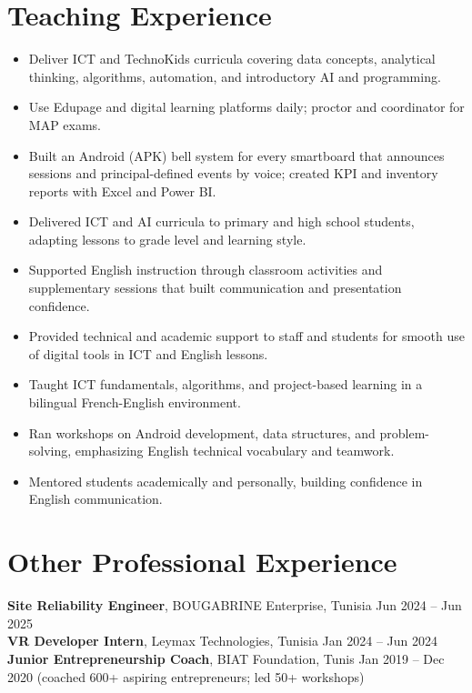 \documentclass[a4paper,10pt]{article}
\begin{document}
\section*{Teaching Experience}
\begin{itemize}
  \item Deliver ICT and TechnoKids curricula covering data concepts, analytical thinking, algorithms, automation, and introductory AI and programming.
  \item Use Edupage and digital learning platforms daily; proctor and coordinator for MAP exams.
  \item Built an Android (APK) bell system for every smartboard that announces sessions and principal-defined events by voice; created KPI and inventory reports with Excel and Power BI.
\end{itemize}
\begin{itemize}
  \item Delivered ICT and AI curricula to primary and high school students, adapting lessons to grade level and learning style.
  \item Supported English instruction through classroom activities and supplementary sessions that built communication and presentation confidence.
  \item Provided technical and academic support to staff and students for smooth use of digital tools in ICT and English lessons.
\end{itemize}
\begin{itemize}
  \item Taught ICT fundamentals, algorithms, and project-based learning in a bilingual French-English environment.
  \item Ran workshops on Android development, data structures, and problem-solving, emphasizing English technical vocabulary and teamwork.
  \item Mentored students academically and personally, building confidence in English communication.
\end{itemize}

\section*{Other Professional Experience}
\textbf{Site Reliability Engineer}, BOUGABRINE Enterprise, Tunisia \hfill Jun 2024 -- Jun 2025\\
\textbf{VR Developer Intern}, Leymax Technologies, Tunisia \hfill Jan 2024 -- Jun 2024\\
\textbf{Junior Entrepreneurship Coach}, BIAT Foundation, Tunis \hfill Jan 2019 -- Dec 2020 (coached 600+ aspiring entrepreneurs; led 50+ workshops)
\end{document}

